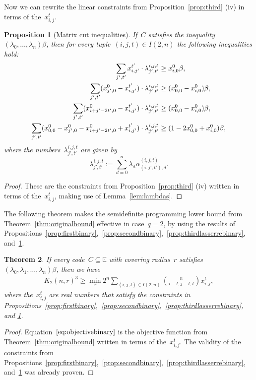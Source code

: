 \documentclass[10pt,a4paper]{article}
\newtheorem{theorem}{Theorem}[section]
\newtheorem{proposition}[theorem]{Proposition}
\theoremstyle{definition}
\begin{document}
Now we can rewrite the linear constraints from Proposition~\ref{prop:third} (iv) in terms of the~$x_{i,j}^t$. 

\begin{proposition}[Matrix cut inequalities]\label{prop:thirdmatrixcutbinary} If~$C$ satisfies the inequality $(\lambda_0,\ldots,\lambda_n)\beta$, then for every tuple~$(i,j,t) \in I(2,n)$ the following inequalities hold:
\begin{align} \label{constraints:matrixcut}
    \sum_{j',t'} x_{i,j'}^{t'} \cdot \lambda_{j',t'}^{i,j,t} & \geq x_{i,0}^0 \beta, \\
    \sum_{j',t'} (x_{j',0}^0 - x_{i,j'}^{t'}) \cdot \lambda_{j',t'}^{i,j,t} & \geq (x_{0,0}^0 -  x_{i,0}^0) \beta, \notag\\
    \sum_{j',t'} (x_{i+j'-2t',0}^0 - x_{i,j'}^{t'} )\cdot \lambda_{j',t'}^{i,j,t} & \geq (x_{0,0}^0 -  x_{i,0}^0) \beta,\notag\\
    \sum_{j',t'} (x_{0,0}^0 - x_{j',0}^0 -x_{i+j'-2t',0}^0 + x_{i,j'}^{t'} )\cdot \lambda_{j',t'}^{i,j,t} & \geq (1-2x_{0,0}^0 +  x_{i,0}^0) \beta, \notag
\end{align}
where the numbers~$\lambda_{j',t'}^{i,j,t}$ are given by
\[
\lambda_{j',t'}^{i,j,t} := \sum_{d=0}^n \lambda_d \alpha_{(i,j',t'),d}^{(i,j,t)}.
\]
\end{proposition}
\begin{proof} 
These are the constraints from Proposition~\ref{prop:third} (iv) written in terms of the~$x_{i,j}^t$, making use of Lemma~\ref{lem:lambdas}. 
\end{proof} 


The following theorem makes the semidefinite programming lower bound from Theorem~\ref{thm:originalbound} effective in case~$q=2$, by using the results of Propositions~\ref{prop:firstbinary},~\ref{prop:secondbinary},~\ref{prop:thirdlasserrebinary}, and~\ref{prop:thirdmatrixcutbinary}.

\begin{theorem} \label{thm:sdplowerbound}
If every code~$C \subseteq \mathbb{E}$ with covering radius~$r$ satisfies $(\lambda_0,\lambda_1,\ldots,\lambda_n)\beta$, then we have
\begin{align}\label{eq:objectivebinary}
    K_2(n,r)^3 \geq \min_x 2^n\sum_{(i,j,t) \in I(2,n)} \binom{n}{i-t,j-t,t}x_{i,j}^{t}, 
\end{align}
where the~$x_{i,j}^t$ are real numbers that satisfy the constraints in Propositions~\ref{prop:firstbinary},~\ref{prop:secondbinary},~\ref{prop:thirdlasserrebinary}, and \ref{prop:thirdmatrixcutbinary}. 
\end{theorem}
\begin{proof} 
Equation~$\eqref{eq:objectivebinary}$ is the objective function from Theorem~\ref{thm:originalbound} written in terms of the~$x_{i,j}^t$. The validity of the constraints from Propositions~\ref{prop:firstbinary},~\ref{prop:secondbinary},~\ref{prop:thirdlasserrebinary}, and~\ref{prop:thirdmatrixcutbinary} was already proven.   
\end{proof} 
\end{document}
